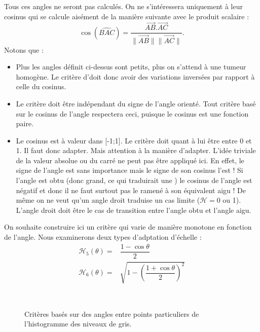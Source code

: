 \documentclass[main.tex]{subfiles}
\begin{document}
Tous ces angles ne seront pas calculés. On ne s'intéressera uniquement à leur cosinus qui se calcule aisément de la manière suivante avec le produit scalaire :
\begin{equation}
\label{eq:cos_prod_scal}
\cos(\widehat{BAC}) = \dfrac{ \overrightarrow{AB}.\overrightarrow{AC} }{ \| \overrightarrow{AB} \| \| \overrightarrow{AC} \|}.
\end{equation}
Notons que :
\begin{itemize}
\item Plus les angles définit ci-dessus sont petits, plus on s'attend à une tumeur homogène. Le critère d'\hetero doit donc avoir des variations inversées par rapport à celle du cosinus.
\item Le critère doit être indépendant du signe de l'angle orienté. Tout critère basé sur le cosinus de l'angle respectera ceci, puisque le cosinus est une fonction paire.
\item Le cosinus est à valeur dans [-1;1]. Le critère doit quant à lui être entre 0 et 1. Il faut donc adapter. Mais attention à la manière d'adapter. L'idée triviale de la valeur absolue ou du  carré ne peut pas être appliqué ici. En effet, le signe de l'angle est sans importance mais le signe de son cosinus l'est ! Si l'angle est obtu (donc grand, ce qui traduirait une \hetero) le cosinus de l'angle est négatif et donc il ne faut surtout pas le ramené à son équivalent aigu ! De même on ne veut qu'un angle droit traduise un cas limite ($\mathcal{H} = 0$ ou 1). L'angle droit doit être le cas de transition entre l'angle obtu et l'angle aigu.
\end{itemize}
On souhaite construire ici un critère qui varie de manière monotone en fonction de l'angle. Nous examinerons deux types d'adptation d'échelle :
\begin{align}
\mathcal{H}_5 (\theta) = &\dfrac{1-\cos \theta}{2} \\
\mathcal{H}_6 (\theta) = &\sqrt{1-\left(  \dfrac{1+\cos \theta}{2}\right)^2}
\end{align}
\begin{figure}
\ 
\caption{\label{fig:crit_hetero_angle}Critères basés sur des angles entre points particuliers de l'histogramme des niveaux de gris.}
\end{figure}
\end{document}
